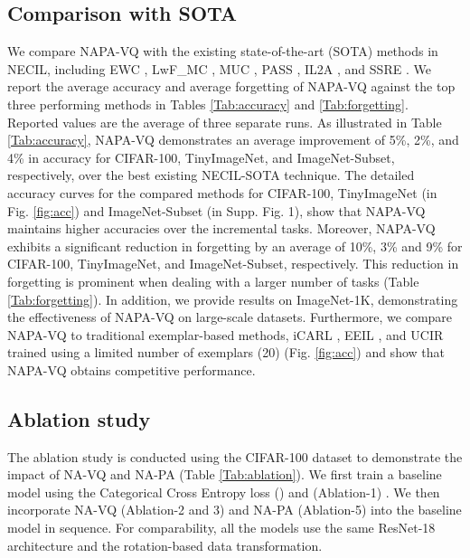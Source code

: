 \documentclass[10pt,twocolumn,letterpaper]{article}
\begin{document}
\subsection{Comparison with SOTA}


We compare NAPA-VQ with the existing state-of-the-art (SOTA) methods in NECIL, including EWC \cite{Kirkpatrick2017OvercomingNetworks}, LwF\_MC \cite{Lampert2017}, MUC \cite{Liu2020MoreLearning},
PASS \cite{Zhu2021PrototypeLearning}, IL2A \cite{Zhu2021Class-IncrementalAugmentation}, and SSRE \cite{Zhu2022Self-SustainingLearning}. We report the average accuracy and average forgetting of NAPA-VQ against the top three performing methods in Tables \ref{Tab:accuracy} and \ref{Tab:forgetting}. Reported values are the average of three separate runs. As illustrated in Table \ref{Tab:accuracy}, NAPA-VQ demonstrates an average improvement of 5\%, 2\%, and 4\% in accuracy for CIFAR-100, TinyImageNet, and ImageNet-Subset, respectively, over the best existing NECIL-SOTA technique. The detailed accuracy curves for the compared methods for CIFAR-100, TinyImageNet (in Fig. \ref{fig:acc}) and ImageNet-Subset (in Supp. Fig. 1), show that NAPA-VQ maintains higher accuracies over the incremental tasks. Moreover, NAPA-VQ exhibits a significant reduction in forgetting by an average of 10\%, 3\% and 9\% for CIFAR-100, TinyImageNet, and ImageNet-Subset, respectively. This reduction in forgetting is prominent when dealing with a larger number of tasks (Table \ref{Tab:forgetting}). 
In addition, we provide results on ImageNet-1K, demonstrating the effectiveness of NAPA-VQ on large-scale datasets. Furthermore, we compare NAPA-VQ to traditional exemplar-based methods, iCARL \cite{Lampert2017}, EEIL \cite{Castro2018End-to-endLearning}, and UCIR \cite{Hou2019LearningRebalancing} trained using a limited number of exemplars (20) (Fig. \ref{fig:acc}) and show that NAPA-VQ obtains competitive performance.  

\subsection{Ablation study}
     The ablation study is conducted using the CIFAR-100 dataset to demonstrate the impact of NA-VQ and NA-PA (Table \ref{Tab:ablation}). 
We first train a baseline model using the Categorical Cross Entropy loss () and  (Ablation-1) \cite{Zhu2022Self-SustainingLearning}. We then incorporate NA-VQ (Ablation-2 and 3) and NA-PA (Ablation-5) into the baseline model in sequence. For comparability, all the models use the same ResNet-18 architecture and the rotation-based data transformation.
\end{document}
